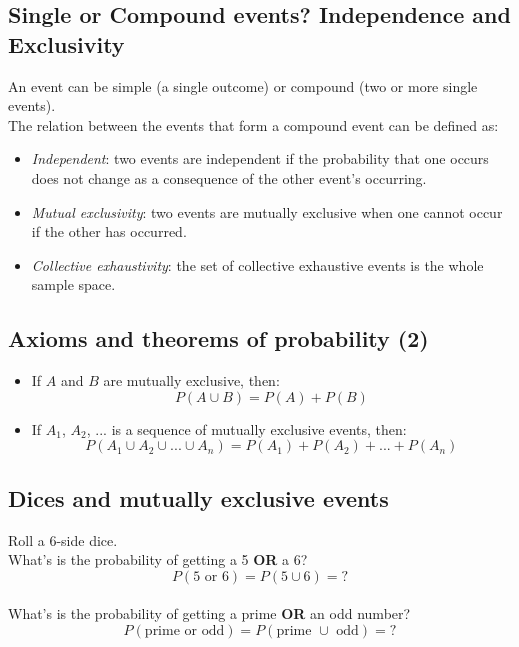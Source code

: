 \documentclass[11pt]{article}
\begin{document}
	\subsection{Single or Compound events? Independence and Exclusivity}

	An event can be simple (a single outcome) or compound (two or more single events).\\

	The relation between the events that form a compound event can be defined as:
	
	\begin{itemize}
		\item \emph{Independent}: two events are independent if the probability that one occurs does not change as a consequence of the other event’s occurring.
		\item \emph{Mutual exclusivity}: two events are mutually exclusive when one cannot occur if the  other has occurred.
		\item \emph{Collective exhaustivity}: the set of collective exhaustive events is the whole sample space.
	\end {itemize}


	\subsection{Axioms and theorems of probability (2)}
	\begin{itemize}
		\item  If $A$ and $B$ are mutually exclusive, then:
	\[P(A \cup B) = P(A) + P (B)\]
		\item  If $A_1$, $A_2$, ... is a sequence of mutually exclusive events, then:
	\[P(A_1 \cup A_2 \cup ... \cup A_n) = P(A_1) + P (A_2) + ... + P(A_n)\]
	\end{itemize}


	\subsection{Dices and mutually exclusive events}

	Roll a 6-side dice.\\
	
	What's is the probability of getting a 5 \textbf{OR} a 6?\\
	\[P(\text{5 or 6}) = P(5 \cup 6) = ?\]\\
	
	What's is the probability of getting a prime \textbf{OR} an odd number?\\
	\[P(\text{prime or odd}) = P(\text{prime }\cup\text{ odd}) = ?\]
\end{document}
